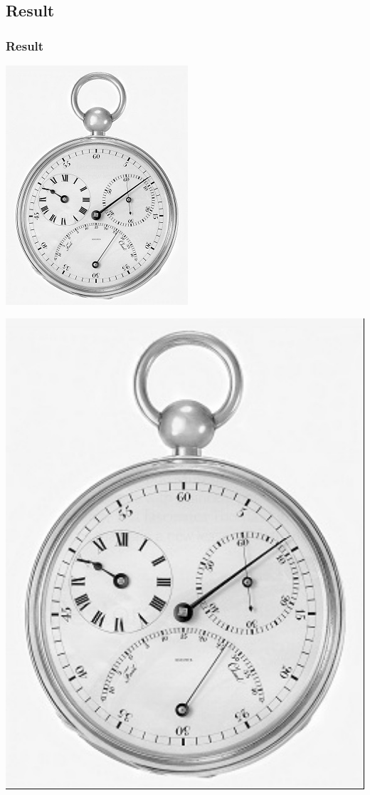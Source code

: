 \documentclass[notheorems,serif,table,compress]{beamer}  %
\begin{document}
\subsection*{Result}
\begin{frame}
\frametitle{Result}
	\begin{minipage}[t]{0.4\linewidth}
        \centering
        \includegraphics[width=0.5\linewidth]{1.jpg} 
        \end{minipage}
	\begin{minipage}[t]{0.4\linewidth}
        \centering
        \includegraphics[width=1\linewidth]{Bilinear-pots.jpg} 
        \end{minipage}

\end{frame}
\end{document}
